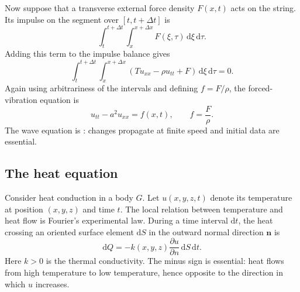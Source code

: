 Now suppose that a transverse external force density $F(x,t)$ acts on the string. Its impulse on the segment over $[t,t+\Delta t]$ is
\begin{equation}
\int_t^{t+\Delta t}\int_x^{x+\Delta x}F(\xi,\tau)\,\mathrm{d}\xi\,\mathrm{d}\tau.
\end{equation}
Adding this term to the impulse balance gives
\begin{equation}
\int_t^{t+\Delta t}\int_x^{x+\Delta x}
\left(Tu_{xx}-\rho u_{tt}+F\right)\,\mathrm{d}\xi\,\mathrm{d}\tau=0.
\end{equation}
Again using arbitrariness of the intervals and defining $f=F/\rho$, the forced-vibration equation is
\begin{equation}
u_{tt}-a^2u_{xx}=f(x,t),
\qquad f=\frac{F}{\rho}.
\end{equation}
The wave equation is : changes propagate at finite speed and initial data are essential.

\subsection{The heat equation}

Consider heat conduction in a body $G$. Let $u(x,y,z,t)$ denote its temperature at position $(x,y,z)$ and time $t$. The local relation between temperature and heat flow is Fourier's experimental law. During a time interval $\mathrm{d}t$, the heat crossing an oriented surface element $\mathrm{d}S$ in the outward normal direction $\mathbf{n}$ is
\begin{equation}
\mathrm{d}Q=-k(x,y,z)\frac{\partial u}{\partial n}\,\mathrm{d}S\,\mathrm{d}t.
\end{equation}
Here $k>0$ is the thermal conductivity. The minus sign is essential: heat flows from high temperature to low temperature, hence opposite to the direction in which $u$ increases.

